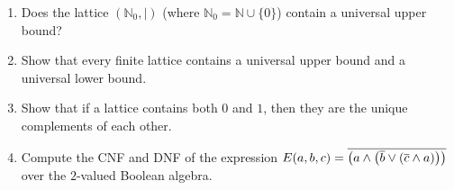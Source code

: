 \documentclass[svgnames]{amsart}
\begin{document}
\begin{enumerate}[leftmargin=*]
\item Does the lattice $(\mathbb N_0, \mid)$ (where $\mathbb N_0 = \mathbb N \cup \{0\}$) contain a universal upper bound?

\item Show that every finite lattice contains a universal upper bound and a universal lower bound.

\item Show that if a lattice contains both $0$ and $1$, then they are the unique complements of each other.

\item Compute the CNF and DNF of the expression $E(a, b, c) = \overline{\pqty{ a \wedge \pqty{ \overline b \vee \pqty{ \overline c \wedge a } } }}$ over the $2$-valued Boolean algebra.
\end{enumerate}
\end{document}
